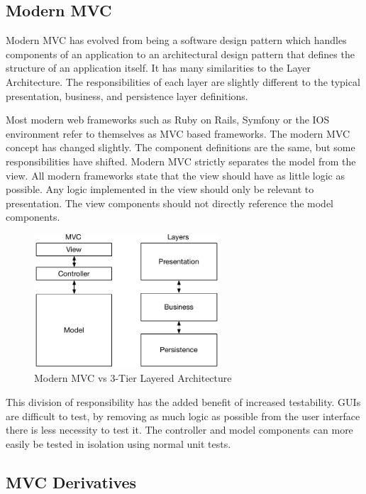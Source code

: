 \subsection{Modern MVC}

Modern MVC has evolved from being a software design pattern which handles components of an application to an architectural design pattern that defines the structure of an application itself. It has many similarities to the Layer Architecture. The responsibilities of each layer are slightly different to the typical presentation, business, and persistence layer definitions.

Most modern web frameworks such as Ruby on Rails, Symfony or the IOS environment refer to themselves as MVC based frameworks. The modern MVC concept has changed slightly. The component definitions are the same, but some responsibilities have shifted. Modern MVC strictly separates the model from the view. All modern frameworks state that the view should have as little logic as possible. Any logic implemented in the view should only be relevant to presentation. The view components should not directly reference the model components\cite{apple_MVC}\cite{symfony_MVC}.

\begin{figure}[H]
    \centering
    \includegraphics[height=5cm,keepaspectratio]{assets/concept/mvc_2.pdf}
    \caption{Modern MVC vs 3-Tier Layered Architecture}
    \label{fig:mvc_2}
\end{figure}

This division of responsibility has the added benefit of increased testability. GUIs are difficult to test, by removing as much logic as possible from the user interface there is less necessity to test it. The controller and model components can more easily be tested in isolation using normal unit tests\cite{mvp_testing}.

\subsection{MVC Derivatives}

